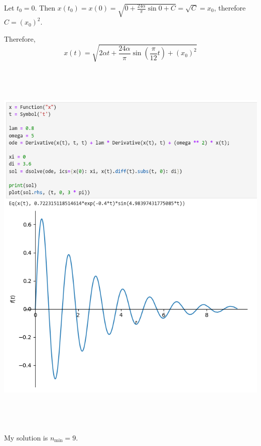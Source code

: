 \documentclass[a4paper]{article}
\begin{document}
Let $t_0 = 0$. Then $x(t_0) = x(0) = \sqrt{0 + \frac{24 \alpha}{\pi} \sin 0 + C} = \sqrt{C} = x_0$, therefore $C = (x_0)^2$.

Therefore, $$x(t) = \sqrt{2\alpha t + \frac{24\alpha}{\pi} \sin \left(\frac{\pi}{12} t\right) + (x_0)^2}$$


\subsection{~}

\includegraphics[scale=0.6]{Q3-a}

\subsection{~}

My solution is $n_\text{min} = 9$.
\end{document}
